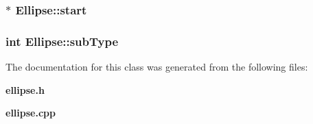 \subsubsection{$\ast$ Ellipse::start\hspace{0.3cm}{\tt  [protected]}}\label{classEllipse_n5}


\subsubsection{\setlength{\rightskip}{0pt plus 5cm}int Ellipse::sub\-Type\hspace{0.3cm}{\tt  [protected]}}\label{classEllipse_n0}




The documentation for this class was generated from the following files:\begin{CompactItemize}
\item 
{\bf ellipse.h}\item 
{\bf ellipse.cpp}\end{CompactItemize}
